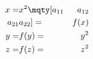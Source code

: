 \begin{equation}
	\begin{aligned}
		x = & x^2 \mqty[a_{11}  & a_{12} \\ a_{21} & a_{22}] = & f(x) \\
		y = & f(y) =                                           & y^2  \\
		z = & f(z) =                                           & z^2
	\end{aligned}
\end{equation}
